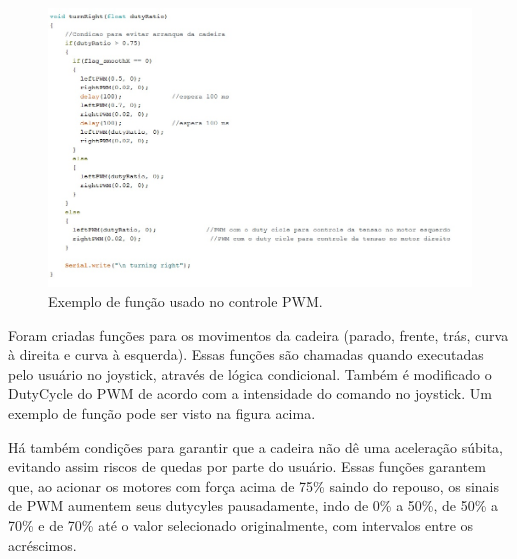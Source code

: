 \begin{figure}[h!]
  \centering
  \includegraphics[width=1.0\textwidth]{figuras/Funcoes.jpg}
  \caption{Exemplo de função usado no controle PWM.}
\end{figure}

Foram criadas funções para os movimentos da cadeira (parado, frente, trás, curva à direita e curva à esquerda). Essas funções são chamadas quando executadas pelo usuário no joystick, através de lógica condicional. Também é modificado o DutyCycle do PWM de acordo com a intensidade do comando no joystick. Um exemplo de função pode ser visto na figura acima.

Há também condições para garantir que a cadeira não dê uma aceleração súbita, evitando assim riscos de quedas por parte do usuário. Essas funções garantem que, ao acionar os motores com força acima de 75\% saindo do repouso, os sinais de PWM aumentem seus dutycyles pausadamente, indo de 0\% a 50\%, de 50\% a 70\% e de 70\% até o valor selecionado originalmente, com intervalos entre os acréscimos.

